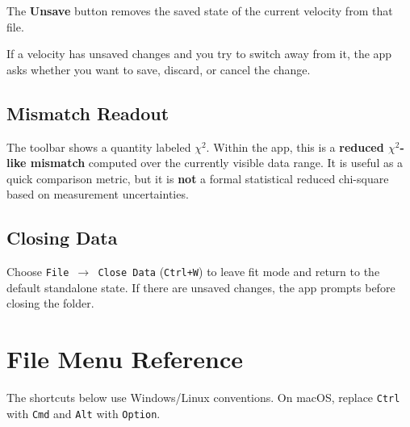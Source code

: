 \documentclass[12pt,a4paper]{article}
\newcommand{\menu}[1]{\texttt{#1}}
\newcommand{\key}[1]{\texttt{#1}}
\begin{document}
The \textbf{Unsave} button removes the saved state of the current velocity from that file.

If a velocity has unsaved changes and you try to switch away from it, the app asks whether you want to
save, discard, or cancel the change.

\subsection{Mismatch Readout}

The toolbar shows a quantity labeled $\chi^2$.
Within the app, this is a \textbf{reduced $\chi^2$-like mismatch} computed over the currently visible data range.
It is useful as a quick comparison metric, but it is \textbf{not} a formal statistical reduced chi-square based on
measurement uncertainties.

\subsection{Closing Data}

Choose \menu{File $\to$ Close Data} (\key{Ctrl+W}) to leave fit mode and return to the default standalone state.
If there are unsaved changes, the app prompts before closing the folder.

\newpage
\section{File Menu Reference}
The shortcuts below use Windows/Linux conventions. On macOS, replace \key{Ctrl} with \key{Cmd} and \key{Alt} with \key{Option}.
\end{document}

